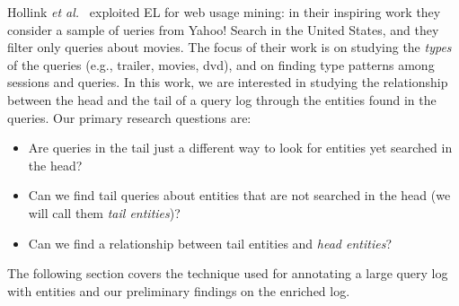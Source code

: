 

Hollink \emph{et al.}~\cite{hollink2013web} exploited EL for web usage mining: 
in their inspiring work they consider a sample of 
ueries from Yahoo! Search in the United States, and they filter only queries about movies. The focus
of their work is on studying the \emph{types} of the queries (e.g., trailer, movies, dvd), and on finding
type patterns among sessions and queries. In this work, we are interested in studying the 
relationship between the head and the tail of a query log through the entities found in the queries. 
Our primary research questions are:
\begin{itemize}
	\item Are queries in the tail just a different way to look for entities yet searched in the head? 
	\item Can we find tail queries about entities that are not searched in the head (we will call them \emph{tail entities})?
	\item Can we find a relationship between tail entities and \emph{head entities}?  
\end{itemize} 

The following section covers the technique used for annotating a large query log with entities and our 
preliminary findings on the enriched log.


 
